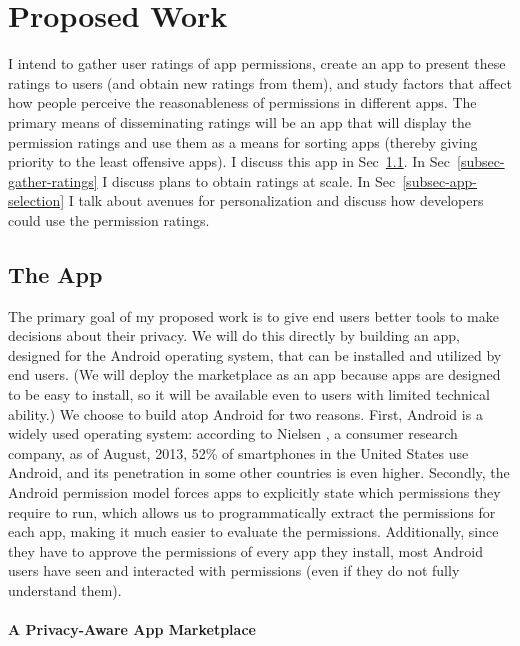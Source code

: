 \documentclass[11pt]{article}
\begin{document}
\section{Proposed Work}

I intend to gather user ratings of app permissions, create 
an app to present these ratings
to users (and obtain new ratings from them), and study factors that
affect how people perceive the reasonableness of permissions in
different apps. The primary means of disseminating ratings will be
an app that will display the permission ratings 
and use them as a means for sorting
apps (thereby giving priority to the least offensive apps). 
I discuss this app in Sec~\ref{subsec-the-apps}. 
In Sec~\ref{subsec-gather-ratings} 
I discuss plans to obtain ratings at scale. In
Sec~\ref{subsec-app-selection} I talk about avenues for personalization 
and discuss how developers could use the permission ratings.

\subsection{The App}
\label{subsec-the-apps}

The primary goal of my proposed work is to give end users better tools to make decisions
about their privacy. We will do this directly by building an app, designed for the Android 
operating system, that can be installed 
and utilized by end users. (We will deploy the marketplace as an app because 
apps are designed to be easy to install, so it will be available even to users 
with limited technical ability.) We choose to build atop Android for two reasons.
First, Android is a widely used operating system: according to Nielsen 
\cite{android-market-share}, a consumer research 
company, as of August, 2013, 52\% of smartphones in the United
States use Android, and its penetration in some other countries is
even higher.
Secondly, the Android permission model forces apps to explicitly state which permissions
they require to run, which allows us to programmatically extract the permissions for each 
app, making it much easier to evaluate the permissions. Additionally, 
since they have to approve the permissions of every app they install, 
most Android users have seen and interacted with permissions (even if they 
do not fully understand them).

\paragraph{A Privacy-Aware App Marketplace}
\label{subsubsec-privacy-store}
\end{document}
